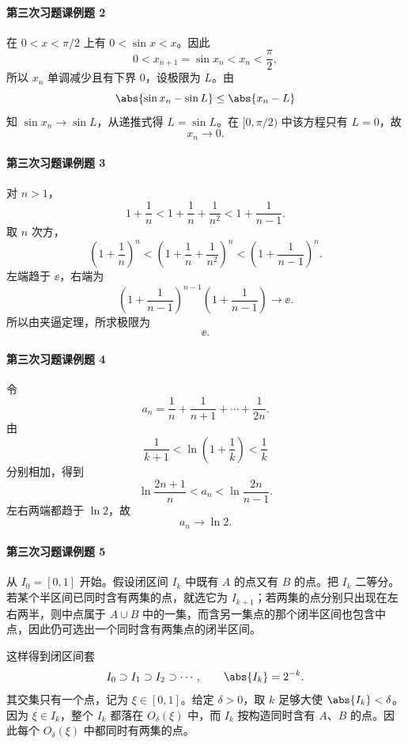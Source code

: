 \paragraph{第三次习题课例题 2}
\begin{xsolution}
在 $0<x<\pi/2$ 上有 $0<\sin x<x$。因此
\[
  0<x_{n+1}=\sin x_n<x_n<\frac\pi2,
\]
所以 $x_n$ 单调减少且有下界 $0$，设极限为 $L$。由
\[
  \abs{\sin x_n-\sin L}\le\abs{x_n-L}
\]
知 $\sin x_n\to\sin L$，从递推式得 $L=\sin L$。在 $[0,\pi/2)$ 中该方程只有 $L=0$，故
\[
  \boxed{x_n\to0}.
\]
\end{xsolution}

\paragraph{第三次习题课例题 3}
\begin{xsolution}
对 $n>1$，
\[
  1+\frac1n
  <1+\frac1n+\frac1{n^2}
  <1+\frac1{n-1}.
\]
取 $n$ 次方，
\[
  \left(1+\frac1n\right)^n
  <\left(1+\frac1n+\frac1{n^2}\right)^n
  <\left(1+\frac1{n-1}\right)^n.
\]
左端趋于 $\ee$，右端为
\[
  \left(1+\frac1{n-1}\right)^{n-1}
  \left(1+\frac1{n-1}\right)\to\ee.
\]
所以由夹逼定理，所求极限为
\[
  \boxed{\ee}.
\]
\end{xsolution}

\paragraph{第三次习题课例题 4}
\begin{xsolution}
令
\[
  a_n=\frac1n+\frac1{n+1}+\cdots+\frac1{2n}.
\]
由
\[
  \frac1{k+1}<\ln\left(1+\frac1k\right)<\frac1k
\]
分别相加，得到
\[
  \ln\frac{2n+1}{n}<a_n<\ln\frac{2n}{n-1}.
\]
左右两端都趋于 $\ln2$，故
\[
  \boxed{a_n\to\ln2}.
\]
\end{xsolution}

\paragraph{第三次习题课例题 5}
\begin{xsolution}
从 $I_0=[0,1]$ 开始。假设闭区间 $I_k$ 中既有 $A$ 的点又有 $B$ 的点。把 $I_k$ 二等分。若某个半区间已同时含有两集的点，就选它为 $I_{k+1}$；若两集的点分别只出现在左右两半，则中点属于 $A\cup B$ 中的一集，而含另一集点的那个闭半区间也包含中点，因此仍可选出一个同时含有两集点的闭半区间。

这样得到闭区间套
\[
  I_0\supset I_1\supset I_2\supset\cdots,
  \qquad \abs{I_k}=2^{-k}.
\]
其交集只有一个点，记为 $\xi\in[0,1]$。给定 $\delta>0$，取 $k$ 足够大使 $\abs{I_k}<\delta$。因为 $\xi\in I_k$，整个 $I_k$ 都落在 $O_\delta(\xi)$ 中，而 $I_k$ 按构造同时含有 $A$、$B$ 的点。因此每个 $O_\delta(\xi)$ 中都同时有两集的点。
\end{xsolution}

